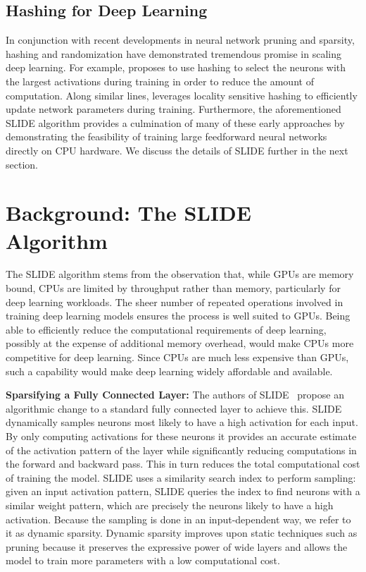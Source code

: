 \documentclass[sigconf]{acmart}
\begin{document}
\subsection{Hashing for Deep Learning}
In conjunction with recent developments in neural network pruning and sparsity, hashing and randomization have demonstrated tremendous promise in scaling deep learning. For example, \cite{spring2017scalable} proposes to use hashing to select the neurons with the largest activations during training in order to reduce the amount of computation. Along similar lines, \cite{chen2020mongoose} leverages locality sensitive hashing to efficiently update network parameters during training. Furthermore, the aforementioned SLIDE algorithm provides a culmination of many of these early approaches by demonstrating the feasibility of training large feedforward neural networks directly on CPU hardware. We discuss the details of SLIDE further in the next section. 











\section{Background: The SLIDE Algorithm}
\label{section:slide}

The SLIDE algorithm stems from the observation that, while GPUs are memory bound, CPUs are limited by throughput rather than memory, particularly for deep learning workloads. The sheer number of repeated operations involved in training deep learning models ensures the process is well suited to GPUs. Being able to efficiently reduce the computational requirements of deep learning, possibly at the expense of additional memory overhead, would make CPUs more competitive for deep learning. Since CPUs are much less expensive than GPUs, such a capability would make deep learning widely affordable and available.

\noindent\textbf{Sparsifying a Fully Connected Layer:}
The authors of SLIDE~\cite{chen2020slide} propose an algorithmic change to a standard fully connected layer to achieve this. SLIDE dynamically samples neurons most likely to have a high activation for each input. By only computing activations for these neurons it provides an accurate estimate of the activation pattern of the layer while significantly reducing computations in the forward and backward pass. This in turn reduces the total computational cost of training the model. SLIDE uses a similarity search index to perform sampling: given an input activation pattern, SLIDE queries the index to find neurons with a similar weight pattern, which are precisely the neurons likely to have a high activation. Because the sampling is done in an input-dependent way, we refer to it as dynamic sparsity. Dynamic sparsity improves upon static techniques such as pruning because it preserves the expressive power of wide layers and allows the model to train more parameters with a low computational cost.
\end{document}
